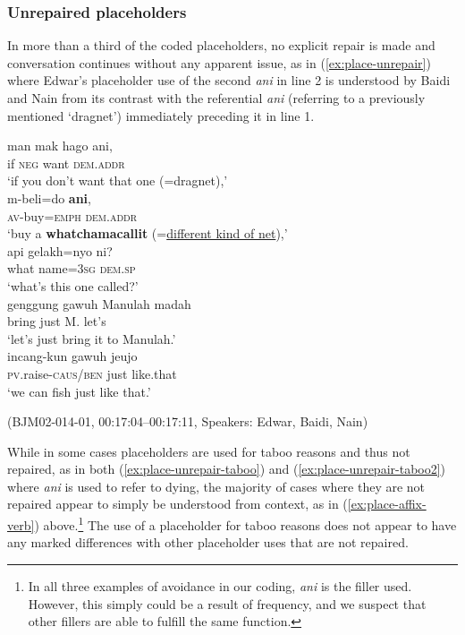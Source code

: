 \documentclass[output=paper,colorlinks,citecolor=brown
\ChapterDOI{10.5281/zenodo.15697585}
]{langscibook}
\begin{document}
\subsubsection{Unrepaired placeholders}
In more than a third of the coded placeholders, no explicit repair is made and conversation continues without any apparent issue, as in (\ref{ex:place-unrepair}) where Edwar's placeholder use of the second \textit{ani} in line 2 is understood by Baidi and Nain from its contrast with the referential \textit{ani} (referring to a previously mentioned `dragnet') immediately preceding it in line 1. 

\begin{exe}
    \ex\label{ex:place-unrepair} \begin{xlist}[0\quad →A:]
         \gll
        man mak hago ani, \\
        if \textsc{neg} want \textsc{dem.addr} \\
        \glt `if you don't want that one (=dragnet),' \\
         \gll
        m-beli=do \textbf{ani}, \\
        \textsc{av}-buy=\textsc{emph} \textsc{dem.addr} \\
        \glt `buy a \textbf{whatchamacallit} (=\uline{different kind of net}),' \\
        \exi{3\quad \hphantom{→E:}} \gll
        api gelakh=nyo ni? \\
        what name=3\textsc{sg} \textsc{dem.sp} \\
        \glt `what's this one called?' \\
         \gll
        genggung gawuh Manulah madah \\
        bring just M. let's \\
        \glt `let's just bring it to Manulah.' \\
         \gll
        incang-kun gawuh jeujo \\
        \textsc{pv.}raise-\textsc{caus/ben} just like.that \\
        \glt `we can fish just like that.' \\
    \end{xlist}
    \hfill (BJM02-014-01, 00:17:04–00:17:11, Speakers: Edwar, Baidi, Nain) 
\end{exe}

While in some cases placeholders are used for taboo reasons and thus not repaired, as in both (\ref{ex:place-unrepair-taboo}) and (\ref{ex:place-unrepair-taboo2}) where \textit{ani} is used to refer to dying, the majority of cases where they are not repaired appear to simply be understood from context, as in (\ref{ex:place-affix-verb}) above.\footnote{In all three examples of avoidance in our coding, \textit{ani} is the filler used. However, this simply could be a result of frequency, and we suspect that other fillers are able to fulfill the same function.} The use of a placeholder for taboo reasons does not appear to have any marked differences with other placeholder uses that are not repaired.
\end{document}
